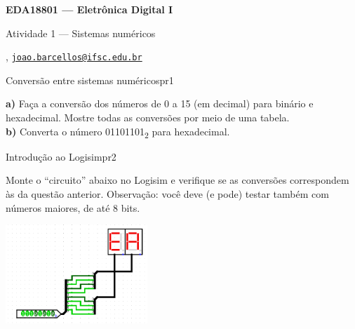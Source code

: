 





\begin{Large}
    \textbf{EDA18801 --- Eletrônica Digital I}
    
    Atividade 1 --- Sistemas numéricos \hfill {}
\end{Large}

\vspace{1ex}
\textbf{} , \href{mailto:joao.barcellos@ifsc.edu.br}{\texttt{joao.barcellos@ifsc.edu.br}}\\
\textbf{}

\vspace{2ex}

\begin{problem}{Conversão entre sistemas numéricos}{pr1}

\textbf{a)} Faça a conversão dos números de 0 a 15 (em decimal) para binário e hexadecimal. Mostre todas as conversões por meio de uma tabela. \\

\textbf{b)} Converta o número 01101101\textsubscript{2} para hexadecimal. \\

\end{problem}

\begin{problem}{Introdução ao Logisim}{pr2}

Monte o ``circuito'' abaixo no Logisim e verifique se as conversões correspondem às da questão anterior. Observação: você deve (e pode) testar também com números maiores, de até 8 bits. \\

\begin{center}
    \includegraphics[width=0.4\textwidth]{./figures/binary_to_hex_logisim.png}
\end{center}

\end{problem}

\newpage

\printbibliography


